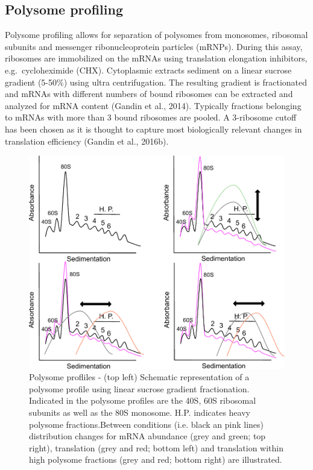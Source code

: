 \documentclass[12pt,openany]{book}
\begin{document}
\subsection{Polysome profiling}

Polysome profiling allows for separation of polysomes from monosomes,
ribosomal subunits and messenger ribonucleoprotein particles (mRNPs).
During this assay, ribosomes are immobilized on the mRNAs using
translation elongation inhibitors, e.g.~cycloheximide (CHX). Cytoplasmic
extracts sediment on a linear sucrose gradient (5-50\%) using ultra
centrifugation. The resulting gradient is fractionated and mRNAs with
different numbers of bound ribosomes can be extracted and analyzed for
mRNA content (Gandin et al., 2014). Typically fractions belonging to
mRNAs with more than 3 bound ribosomes are pooled. A 3-ribosome cutoff
has been chosen as it is thought to capture most biologically relevant
changes in translation efficiency (Gandin et al., 2016b).

\begin{figure}
    \includegraphics[width=0.9\linewidth]{./figures/polysome_shifts.pdf}
  \caption{Polysome profliles -  (top left) Schematic representation of a polysome profile using linear sucrose gradient fractionation. Indicated in the polysome profiles are the 40S, 60S ribosomal subunits as well as the 80S monosome. H.P. indicates heavy polysome fractions.Between conditions (i.e. black an pink lines) distribution changes for mRNA abundance (grey and green; top right), translation (grey and red; bottom left) and translation within high polysome fractions (grey and red; bottom right) are illustrated. \label{fig:polysome}}
\end{figure}
\end{document}
